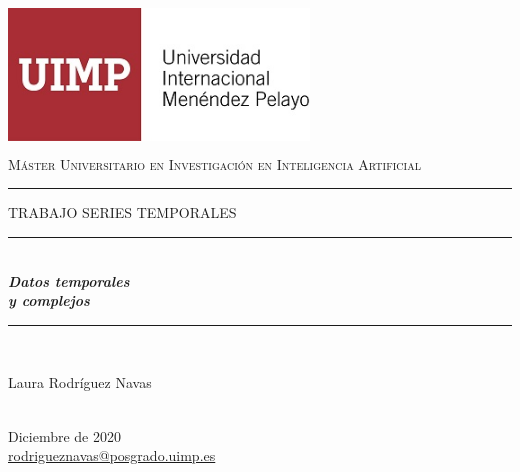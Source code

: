 \begin{titlepage}

\newcommand{\HRule}{\rule{\linewidth}{0.5mm}} %

\center %


\begin{minipage}{14cm}
\center

\includegraphics[width=8cm,height=4cm]{logo}\\[0.5cm] %


\textsc{\LARGE Máster Universitario en Investigación en Inteligencia Artificial}\\[2.5cm] 



\rule[1.7mm]{2cm}{0.5mm}
\hfill
\textsc{\Large TRABAJO SERIES TEMPORALES} 
\hfill
\rule[1.7mm]{2cm}{0.5mm} 
\\[0.75cm]

{\Huge
\textbf{\textit{
Datos temporales \\[0.2cm]
y complejos
}}}\\[0.75cm] 

\HRule \\[4cm]


{\Large

Laura Rodríguez Navas} \\[0.5cm]

{\large
Diciembre de 2020 } \\[0.5cm]

{\large
\href{rodrigueznavas@posgrado.uimp.es}{rodrigueznavas@posgrado.uimp.es}
}

\end{minipage}

\vfill %

\cleardoublepage
\thispagestyle{empty}
\end{titlepage}

\raggedbottom

